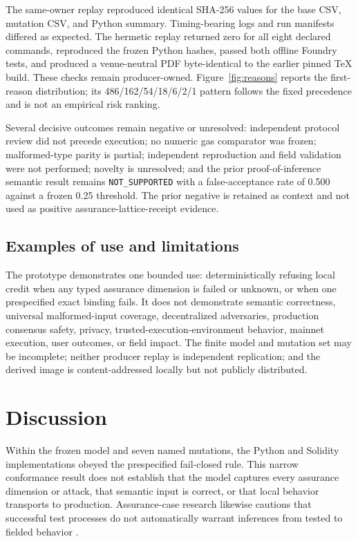 \documentclass[utf8]{FrontiersinHarvard}
\begin{document}
The same-owner replay reproduced identical SHA-256 values for the base CSV, mutation CSV, and Python summary. Timing-bearing logs and run manifests differed as expected. The hermetic replay returned zero for all eight declared commands, reproduced the frozen Python hashes, passed both offline Foundry tests, and produced a venue-neutral PDF byte-identical to the earlier pinned TeX build. These checks remain producer-owned. Figure~\ref{fig:reasons} reports the first-reason distribution; its 486/162/54/18/6/2/1 pattern follows the fixed precedence and is not an empirical risk ranking.

Several decisive outcomes remain negative or unresolved: independent protocol review did not precede execution; no numeric gas comparator was frozen; malformed-type parity is partial; independent reproduction and field validation were not performed; novelty is unresolved; and the prior proof-of-inference semantic result remains \texttt{NOT\_SUPPORTED} with a false-acceptance rate of 0.500 against a frozen 0.25 threshold. The prior negative is retained as context and not used as positive assurance-lattice-receipt evidence.

\subsection{Examples of use and limitations}

The prototype demonstrates one bounded use: deterministically refusing local credit when any typed assurance dimension is failed or unknown, or when one prespecified exact binding fails. It does not demonstrate semantic correctness, universal malformed-input coverage, decentralized adversaries, production consensus safety, privacy, trusted-execution-environment behavior, mainnet execution, user outcomes, or field impact. The finite model and mutation set may be incomplete; neither producer replay is independent replication; and the derived image is content-addressed locally but not publicly distributed.

\section{Discussion}

Within the frozen model and seven named mutations, the Python and Solidity implementations obeyed the prespecified fail-closed rule. This narrow conformance result does not establish that the model captures every assurance dimension or attack, that semantic input is correct, or that local behavior transports to production. Assurance-case research likewise cautions that successful test processes do not automatically warrant inferences from tested to fielded behavior \citep{richard2026agentic}.
\end{document}
